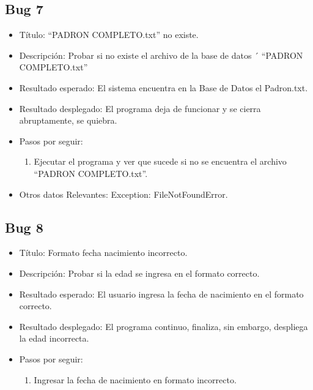 \documentclass[conference]{IEEEtran}
\begin{document}
\subsection*{Bug 7}
\begin{itemize}
\item Título: “PADRON COMPLETO.txt” no existe.

\item Descripción: Probar si no existe el archivo de la base de datos ´ “PADRON COMPLETO.txt”

\item Resultado esperado: El sistema encuentra en la Base de Datos el 
Padron.txt.

\item Resultado desplegado: El programa deja de funcionar y se cierra abruptamente, se quiebra. 

\item Pasos por seguir: 
\begin{enumerate}
\item Ejecutar el programa y ver que sucede si no se encuentra el archivo “PADRON COMPLETO.txt”.
\end{enumerate}
\item Otros datos Relevantes: Exception: FileNotFoundError.

\end{itemize}
\subsection*{Bug 8}
\begin{itemize}
\item Título: Formato fecha nacimiento incorrecto.

\item Descripción: Probar si la edad se ingresa en el formato correcto.

\item Resultado esperado: El usuario ingresa la fecha de nacimiento en el formato correcto.

\item Resultado desplegado: El programa continuo, finaliza, sin embargo, despliega la edad incorrecta.

\item Pasos por seguir: 
\begin{enumerate}
\item Ingresar la fecha de nacimiento en formato incorrecto.
\end{enumerate}

\end{itemize}
\end{document}
